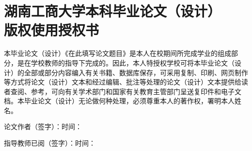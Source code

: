 
\chapter*{湖南工商大学本科毕业论文（设计）\protect\\版权使用授权书}

本毕业论文（设计）《在此填写论文题目》是本人在校期间所完成学业的组成部分，是在学校教师的指导下完成的。因此，本人特授权学校可将本毕业论文（设计）的全部或部分内容编入有关书籍、数据库保存，可采用复制、印刷、网页制作等方式将论文（设计）文本和经过编辑、批注等处理的论文（设计）文本提供给读者查阅、参考，可向有关学术部门和国家有关教育主管部门呈送复印件和电子文档。本毕业论文（设计）无论做何种处理，必须尊重本人的著作权，署明本人姓名。

\vspace{80pt}
\noindent 论文作者（签字）：\underline{\hspace{4cm}}\hfill 时间：\underline{\hspace{3cm}}

\vspace{50pt}
\noindent 指导教师已阅（签字）：\underline{\hspace{4cm}}\hfill 时间：\underline{\hspace{3cm}}
